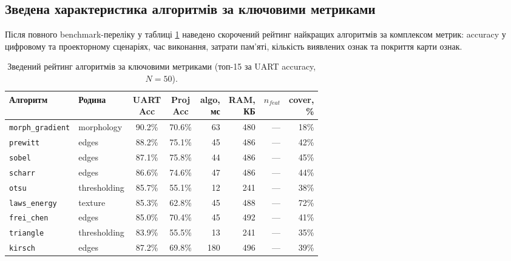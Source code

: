 \documentclass[a4paper,12pt]{article}
\begin{document}
\subsection{Зведена характеристика алгоритмів за ключовими метриками}

Після повного benchmark-переліку у таблиці \ref{tab:algo_summary} наведено скорочений рейтинг найкращих алгоритмів за комплексом метрик: accuracy у цифровому та проекторному сценаріях, час виконання, затрати пам'яті, кількість виявлених ознак та покриття карти ознак.

\begin{table}[H]
	\centering\small
	\setlength{\tabcolsep}{3pt}
	\renewcommand{\arraystretch}{1.12}
	\caption{Зведений рейтинг алгоритмів за ключовими метриками (топ-15 за UART accuracy, $N=50$).}
	\label{tab:algo_summary}
	\begin{tabular}{@{}l l c c r r r r@{}}
		\toprule
		Алгоритм & Родина & \shortstack{UART\\Acc} & \shortstack{Proj\\Acc} & \shortstack{algo,\\мс} & \shortstack{RAM,\\КБ} & $n_{feat}$ & \shortstack{cover,\\\%} \\
		\midrule
		\texttt{morph\_gradient} & morphology   & 90.2\% & 70.6\% & 63   & 480  & ---    & 18\% \\
		\texttt{prewitt}         & edges        & 88.2\% & 75.1\% & 45   & 486  & ---    & 42\% \\
		\texttt{sobel}           & edges        & 87.1\% & 75.8\% & 44   & 486  & ---    & 45\% \\
		\texttt{scharr}          & edges        & 86.6\% & 74.6\% & 47   & 486  & ---    & 44\% \\
		\texttt{otsu}            & thresholding & 85.7\% & 55.1\% & 12   & 241  & ---    & 38\% \\
		\texttt{laws\_energy}    & texture      & 85.3\% & 62.8\% & 45   & 488  & ---    & 72\% \\
		\texttt{frei\_chen}      & edges        & 85.0\% & 70.4\% & 45   & 492  & ---    & 41\% \\
		\texttt{triangle}        & thresholding & 83.9\% & 55.5\% & 13   & 241  & ---    & 35\% \\
		\texttt{kirsch}          & edges        & 87.2\% & 69.8\% & 180  & 496  & ---    & 39\% \\

\end{tabular}
\end{table}
\end{document}
